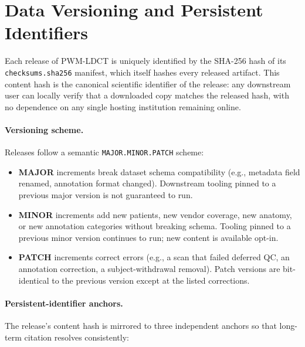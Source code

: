 \documentclass[twoside,11pt]{article}
\begin{document}
\section*{Data Versioning and Persistent Identifiers}

Each release of PWM-LDCT is uniquely identified by the SHA-256 hash of its \texttt{checksums.sha256} manifest, which itself hashes every released artifact. This content hash is the canonical scientific identifier of the release: any downstream user can locally verify that a downloaded copy matches the released hash, with no dependence on any single hosting institution remaining online.

\paragraph{Versioning scheme.} Releases follow a semantic \texttt{MAJOR.MINOR.PATCH} scheme:
\begin{itemize}
    \item \textbf{MAJOR} increments break dataset schema compatibility (e.g., metadata field renamed, annotation format changed). Downstream tooling pinned to a previous major version is not guaranteed to run.
    \item \textbf{MINOR} increments add new patients, new vendor coverage, new anatomy, or new annotation categories without breaking schema. Tooling pinned to a previous minor version continues to run; new content is available opt-in.
    \item \textbf{PATCH} increments correct errors (e.g., a scan that failed deferred QC, an annotation correction, a subject-withdrawal removal). Patch versions are bit-identical to the previous version except at the listed corrections.
\end{itemize}

\paragraph{Persistent-identifier anchors.} The release's content hash is mirrored to three independent anchors so that long-term citation resolves consistently:
\end{document}
